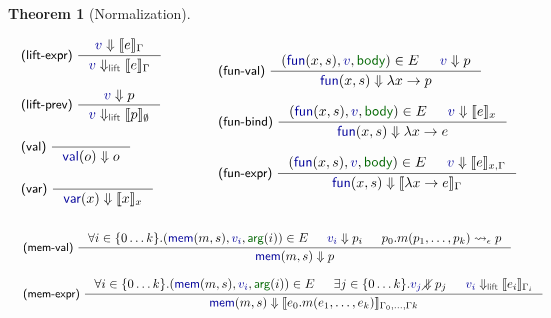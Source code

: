 \documentclass[acmsmall,anonymous,fleqn]{acmart}\settopmatter{printfolios=false,printccs=false,printacmref=false}
\newcounter{thc}
\theoremstyle{plain}
\newtheorem{theorem}[thc]{Theorem}
\theoremstyle{definition}
\newcommand{\ident}[1]{\textnormal{\textcolor{idclr}{\sffamily #1}}}
\newcommand{\bndclr}[1]{\textcolor{kvdclr}{#1}}
\newcommand{\bnd}[1]{\textnormal{\textcolor{kvdclr}{\sffamily #1}}}
\newcommand{\blbl}[1]{\textnormal{\textcolor{numclr}{\sffamily #1}}}
\newcommand{\rname}[1]{{\sffamily\small(#1)}}
\begin{document}
\begin{theorem}[Normalization]
\begin{figure}[b]
\begin{equation*}
\hspace{-2.5em}
\begin{array}{l}
\inference[\rname{lift-expr}~]
  {\bndclr{v} \Downarrow \llbracket e \rrbracket_\Gamma}
  {\bndclr{v} \Downarrow_{\ident{lift}} \llbracket e \rrbracket_\Gamma}
\\
\\
\inference[\rname{lift-prev}~]
  {\bndclr{v} \Downarrow p}
  {\bndclr{v} \Downarrow_{\ident{lift}} \llbracket p \rrbracket_\emptyset}
\\
\\
\inference[\rname{val}~]
  {~}
  {\bnd{val}(o) \Downarrow o }
\\
\\
\inference[\rname{var}~]
  {~}
  {\bnd{var}(x) \Downarrow \llbracket x \rrbracket_x}
  \\[0.5em]~
\end{array}
\qquad\quad
\begin{array}{l}
\inference[\rname{fun-val}~]
  { (\bnd{fun}(x, s), \bndclr{v}, \blbl{body}) \in E & \bndclr{v} \Downarrow p }
  { \bnd{fun}(x, s) \Downarrow \lambda x\rightarrow p }
\\
\\
\inference[\rname{fun-bind}~]
  { (\bnd{fun}(x, s), \bndclr{v}, \blbl{body}) \in E & \bndclr{v} \Downarrow \llbracket e \rrbracket_{x} }
  { \bnd{fun}(x, s) \Downarrow \lambda x\rightarrow e }
\\
\\
\inference[\rname{fun-expr}~]
  { (\bnd{fun}(x, s), \bndclr{v}, \blbl{body}) \in E & \bndclr{v} \Downarrow \llbracket e \rrbracket_{x,\Gamma} }
  { \bnd{fun}(x, s) \Downarrow \llbracket \lambda x\rightarrow e \rrbracket_\Gamma }
\\[0.5em]~
\end{array}
\end{equation*}
\begin{equation*}
\hspace{-2.5em}
\begin{array}{l}
\inference[\rname{mem-val}~]
  { \forall i\in\{0\ldots k\}.(\bnd{mem}(m, s), \bndclr{v_i}, \blbl{arg}(i)) \in E & \bndclr{v_i} \Downarrow p_i
    & p_0.m(p_1, \ldots, p_k) \rightsquigarrow_\epsilon p }
  { \bnd{mem}(m, s) \Downarrow p }
\\
\\
\inference[\rname{mem-expr}~]
  { \forall i\in\{0\ldots k\}.(\bnd{mem}(m, s), \bndclr{v_i}, \blbl{arg}(i)) \in E & \exists j\in\{0\ldots k\}.\bndclr{v_j}\diagup\hspace{-1em}\Downarrow p_j
   & \bndclr{v_i} \Downarrow_{\ident{lift}} \llbracket e_i \rrbracket_{\Gamma_i}  }
  { \bnd{mem}(m, s) \Downarrow \llbracket e_0.m(e_1, \ldots, e_k) \rrbracket_{\Gamma_0,\ldots,\Gamma k} }
\\
\end{array}
\end{equation*}


\end{figure}
\end{theorem}
\end{document}
